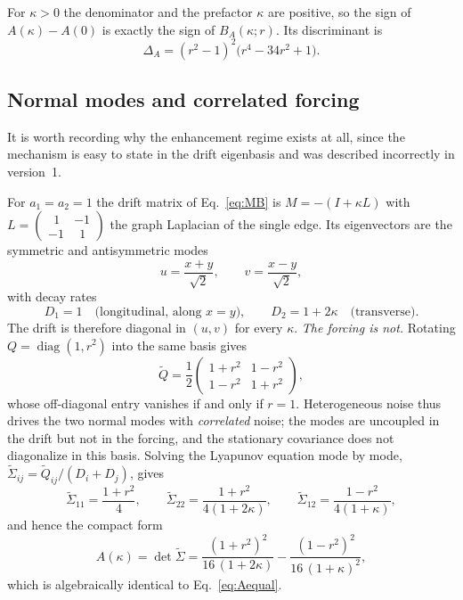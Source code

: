 \documentclass[11pt]{article}
\theoremstyle{plain}
\theoremstyle{remark}
\begin{document}
For $\kappa>0$ the denominator and the prefactor $\kappa$ are positive, so the sign of
$A(\kappa)-A(0)$ is exactly the sign of $B_A(\kappa;r)$. Its discriminant is
\begin{equation}
  \Delta_A=(r^2-1)^2\bigl(r^4-34r^2+1\bigr). \label{eq:discA}
\end{equation}

\subsection{Normal modes and correlated forcing}\label{sec:normalmodes}

It is worth recording why the enhancement regime exists at all, since the mechanism is easy to
state in the drift eigenbasis and was described incorrectly in version~1.

For $a_1=a_2=1$ the drift matrix of Eq.~\eqref{eq:MB} is $M=-(I+\kappa L)$ with
$L=\left(\begin{smallmatrix}\ \ 1&-1\\ -1&\ \ 1\end{smallmatrix}\right)$ the graph Laplacian of the single
edge. Its eigenvectors are the symmetric and antisymmetric modes
\[
  u=\frac{x+y}{\sqrt2},\qquad v=\frac{x-y}{\sqrt2},
\]
with decay rates
\[
  D_1=1 \quad\text{(longitudinal, along } x=y\text{)},
  \qquad
  D_2=1+2\kappa \quad\text{(transverse)} .
\]
The drift is therefore diagonal in $(u,v)$ for every $\kappa$. \emph{The forcing is not.}
Rotating $Q=\operatorname{diag}(1,r^2)$ into the same basis gives
\begin{equation}
  \widetilde Q=\frac12\begin{pmatrix}1+r^2 & 1-r^2\\ 1-r^2 & 1+r^2\end{pmatrix},
  \label{eq:Qtilde}
\end{equation}
whose off-diagonal entry vanishes if and only if $r=1$. Heterogeneous noise thus drives the two
normal modes with \emph{correlated} noise; the modes are uncoupled in the drift but not in the
forcing, and the stationary covariance does not diagonalize in this basis. Solving the Lyapunov
equation mode by mode, $\widetilde\Sigma_{ij}=\widetilde Q_{ij}/(D_i+D_j)$, gives
\[
  \widetilde\Sigma_{11}=\frac{1+r^2}{4},\qquad
  \widetilde\Sigma_{22}=\frac{1+r^2}{4(1+2\kappa)},\qquad
  \widetilde\Sigma_{12}=\frac{1-r^2}{4(1+\kappa)},
\]
and hence the compact form
\begin{equation}
  A(\kappa)=\det\widetilde\Sigma
  =\frac{(1+r^2)^2}{16\,(1+2\kappa)}-\frac{(1-r^2)^2}{16\,(1+\kappa)^2},
  \label{eq:Amodal}
\end{equation}
which is algebraically identical to Eq.~\eqref{eq:Aequal}.
\end{document}

